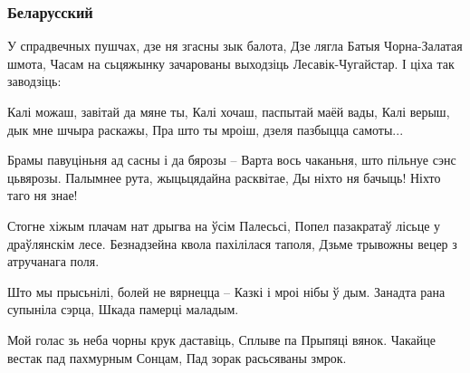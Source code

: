  
 

\subsubsection{Беларусский}
\label{sec:songs.tin_soncja.pisnja_chugajstera.bel}

У спрадвечных пушчах, дзе ня згасны зык балота,
Дзе лягла Батыя Чорна-Залатая шмота,
Часам на сьцяжынку зачарованы выходзіць
Лесавік-Чугайстар. І ціха так заводзіць:

Калі можаш, завітай да мяне ты,
Калі хочаш, паспытай маёй вады,
Калі верыш, дык мне шчыра раскажы,
Пра што ты мроіш, дзеля пазбыцца самоты...

Брамы павуціньня ад сасны і да бярозы –
Варта вось чаканьня, што пільнуе сэнс цьвярозы.
Палымнее рута, жыцьцядайна расквітае,
Ды ніхто ня бачыць! Ніхто таго ня знае!

Стогне хіжым плачам нат дрыгва на ўсім Палесьсі,
Попел пазакратаў лісьце у драўлянскім лесе.
Безнадзейна квола пахілілася таполя,
Дзьме трывожны вецер з атручанага поля.

Што мы прысьнілі, болей не вярнецца –
Казкі і мроі нібы ў дым.
Занадта рана супыніла сэрца,
Шкада памерці маладым.

Мой голас зь неба чорны крук даставіць,
Сплыве па Прыпяці вянок.
Чакайце вестак пад пахмурным Сонцам,
Пад зорак расьсяваны змрок.
